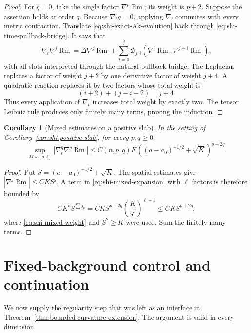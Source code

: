 \documentclass[10pt]{coll-l}
\newtheorem{corollary}[theorem]{Corollary}
\theoremstyle{definition}
\theoremstyle{remark}
\numberwithin{section}{chapter}
\numberwithin{equation}{chapter}
\newcommand{\Rm}{\operatorname{Rm}}
\begin{document}
\begin{proof}
For $q=0$, take the single factor $\nabla^p\Rm$; its weight is $p+2$.
Suppose the assertion holds at order $q$.  Because $\nabla_tg=0$, applying
$\nabla_t$ commutes with every metric contraction.  Translate
\eqref{eq:shi-exact-Ak-evolution} back through
\eqref{eq:shi-time-pullback-bridge}.  It says that
\begin{equation}
 \nabla_t\nabla^j\Rm
   =\Delta\nabla^j\Rm
      +\sum_{i=0}^j\mathcal B_{j,i}
          (\nabla^i\Rm,\nabla^{j-i}\Rm),                 \label{eq:shi-time-one-factor}
\end{equation}
with all slots interpreted through the natural pullback bridge.
The Laplacian replaces a factor of weight $j+2$ by one derivative factor of
weight $j+4$.  A quadratic reaction replaces it by two factors whose total
weight is
\[
          (i+2)+(j-i+2)=j+4.
\]
Thus every application of $\nabla_t$ increases total weight by exactly two.
The tensor Leibniz rule produces only finitely many terms, proving the
induction.
\end{proof}

\begin{corollary}[Mixed estimates on a positive slab]
\label{cor:shi-mixed-slab}
In the setting of Corollary~\ref{cor:shi-positive-slab}, for every
$p,q\geq0$,
\begin{equation}
 \sup_{M\times[a,b]}
       |\nabla_t^q\nabla^p\Rm|
 \leq C(n,p,q)K
       \left((a-a_0)^{-1/2}+\sqrt K\right)^{p+2q}.        \label{eq:shi-mixed-slab}
\end{equation}
\end{corollary}

\begin{proof}
Put $S=(a-a_0)^{-1/2}+\sqrt K$.  The spatial estimates give
$|\nabla^j\Rm|\leq CKS^j$.  A term in
\eqref{eq:shi-mixed-expansion} with $\ell$ factors is therefore bounded by
\[
 C K^\ell S^{\sum j_\nu}
   =CKS^{p+2q}\left(\frac K{S^2}\right)^{\ell-1}
   \leq CKS^{p+2q},
\]
where \eqref{eq:shi-mixed-weight} and $S^2\geq K$ were used.  Sum the
finitely many terms.
\end{proof}

\section{Fixed-background control and continuation}
\label{sec:shi-continuation}

We now supply the regularity step that was left as an interface in
Theorem~\ref{thm:bounded-curvature-extension}.  The argument is valid in
every dimension.
\end{document}
